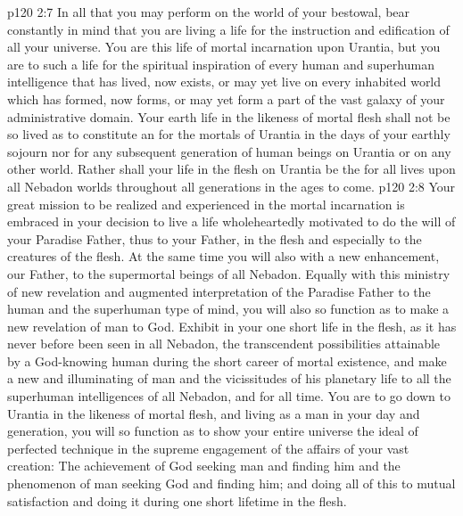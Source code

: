 \pc \vs p120 2:7 \bibnobreakspace In all that you may perform on the world of your bestowal, bear constantly in mind that you are living a life for the instruction and edification of all your universe. You are  this life of mortal incarnation upon Urantia, but you are to  such a life for the spiritual inspiration of every human and superhuman intelligence that has lived, now exists, or may yet live on every inhabited world which has formed, now forms, or may yet form a part of the vast galaxy of your administrative domain. Your earth life in the likeness of mortal flesh shall not be so lived as to constitute an  for the mortals of Urantia in the days of your earthly sojourn nor for any subsequent generation of human beings on Urantia or on any other world. Rather shall your life in the flesh on Urantia be the  for all lives upon all Nebadon worlds throughout all generations in the ages to come.
\pc \vs p120 2:8 \bibnobreakspace Your great mission to be realized and experienced in the mortal incarnation is embraced in your decision to live a life wholeheartedly motivated to do the will of your Paradise Father, thus to  your Father, in the flesh and especially to the creatures of the flesh. At the same time you will also  with a new enhancement, our Father, to the supermortal beings of all Nebadon. Equally with this ministry of new revelation and augmented interpretation of the Paradise Father to the human and the superhuman type of mind, you will also so function as to make a new revelation of man to God. Exhibit in your one short life in the flesh, as it has never before been seen in all Nebadon, the transcendent possibilities attainable by a God\hyp{}knowing human during the short career of mortal existence, and make a new and illuminating  of man and the vicissitudes of his planetary life to all the superhuman intelligences of all Nebadon, and for all time. You are to go down to Urantia in the likeness of mortal flesh, and living as a man in your day and generation, you will so function as to show your entire universe the ideal of perfected technique in the supreme engagement of the affairs of your vast creation: The achievement of God seeking man and finding him and the phenomenon of man seeking God and finding him; and doing all of this to mutual satisfaction and doing it during one short lifetime in the flesh.\plusone
